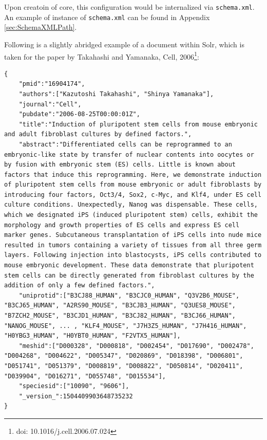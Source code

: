 Upon creatoin of core, this configuration would be internalized via \texttt{schema.xml}. An example of instance of \texttt{schema.xml} can be found in Appendix \ref{sec:SchemaXMLPath}.

Following is a slightly abridged example of a document within Solr, which is taken for the paper by Takahashi and Yamanaka, Cell, 2006\footnote{doi: 10.1016/j.cell.2006.07.024}:

\label{lst:SolrDoc}
\begin{lstlisting}[breaklines]
{
	"pmid":"16904174",
	"authors":["Kazutoshi Takahashi", "Shinya Yamanaka"],
	"journal":"Cell",
	"pubdate":"2006-08-25T00:00:01Z",
	"title":"Induction of pluripotent stem cells from mouse embryonic and adult fibroblast cultures by defined factors.",
	"abstract":"Differentiated cells can be reprogrammed to an embryonic-like state by transfer of nuclear contents into oocytes or by fusion with embryonic stem (ES) cells. Little is known about factors that induce this reprogramming. Here, we demonstrate induction of pluripotent stem cells from mouse embryonic or adult fibroblasts by introducing four factors, Oct3/4, Sox2, c-Myc, and Klf4, under ES cell culture conditions. Unexpectedly, Nanog was dispensable. These cells, which we designated iPS (induced pluripotent stem) cells, exhibit the morphology and growth properties of ES cells and express ES cell marker genes. Subcutaneous transplantation of iPS cells into nude mice resulted in tumors containing a variety of tissues from all three germ layers. Following injection into blastocysts, iPS cells contributed to mouse embryonic development. These data demonstrate that pluripotent stem cells can be directly generated from fibroblast cultures by the addition of only a few defined factors.",
	"uniprotid":["B3CJ88_HUMAN", "B3CJC0_HUMAN", "Q3V2B6_MOUSE", "B3CJ65_HUMAN", "A2RS90_MOUSE", "B3CJB3_HUMAN", "Q3UES8_MOUSE", "B7ZCH2_MOUSE", "B3CJD1_HUMAN", "B3CJ82_HUMAN", "B3CJ66_HUMAN", "NANOG_MOUSE", ... , "KLF4_MOUSE", "J7H3Z5_HUMAN", "J7H416_HUMAN", "H0YBG3_HUMAN", "H0YBT0_HUMAN", "F2VTX5_HUMAN"],
	"meshid":["D000328", "D000818", "D002454", "D017690", "D002478", "D004268", "D004622", "D005347", "D020869", "D018398", "D006801", "D051741", "D051379", "D008819", "D008822", "D050814", "D020411", "D039904", "D016271", "D055748", "D015534"],
	"speciesid":["10090", "9606"],
	"_version_":1504409903648735232
}
\end{lstlisting}


